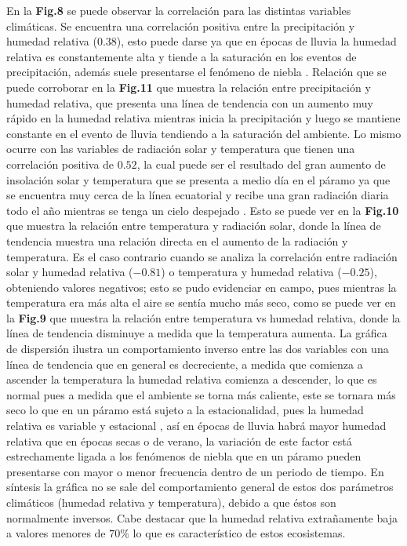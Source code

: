 \documentclass[conference,final,]{IEEEtran}
\begin{document}
En la \textbf{Fig.8} se puede observar la correlación para las distintas
variables climáticas. Se encuentra una correlación positiva entre la
precipitación y humedad relativa (\(0.38\)), esto puede darse ya que en
épocas de lluvia la humedad relativa es constantemente alta y tiende a
la saturación en los eventos de precipitación, además suele presentarse
el fenómeno de niebla \cite{morales2019atlas}. Relación que se puede
corroborar en la \textbf{Fig.11} que muestra la relación entre
precipitación y humedad relativa, que presenta una línea de tendencia
con un aumento muy rápido en la humedad relativa mientras inicia la
precipitación y luego se mantiene constante en el evento de lluvia
tendiendo a la saturación del ambiente. Lo mismo ocurre con las
variables de radiación solar y temperatura que tienen una correlación
positiva de \(0.52\), la cual puede ser el resultado del gran aumento de
insolación solar y temperatura que se presenta a medio día en el páramo
ya que se encuentra muy cerca de la línea ecuatorial y recibe una gran
radiación diaria todo el año mientras se tenga un cielo despejado
\cite{buytaert2006hidrologia}. Esto se puede ver en la \textbf{Fig.10}
que muestra la relación entre temperatura y radiación solar, donde la
línea de tendencia muestra una relación directa en el aumento de la
radiación y temperatura. Es el caso contrario cuando se analiza la
correlación entre radiación solar y humedad relativa (\(-0.81\)) o
temperatura y humedad relativa (\(-0.25\)), obteniendo valores
negativos; esto se pudo evidenciar en campo, pues mientras la
temperatura era más alta el aire se sentía mucho más seco, como se puede
ver en la \textbf{Fig.9} que muestra la relación entre temperatura vs
humedad relativa, donde la línea de tendencia disminuye a medida que la
temperatura aumenta. La gráfica de dispersión ilustra un comportamiento
inverso entre las dos variables con una línea de tendencia que en
general es decreciente, a medida que comienza a ascender la temperatura
la humedad relativa comienza a descender, lo que es normal pues a medida
que el ambiente se torna más caliente, este se tornara más seco lo que
en un páramo está sujeto a la estacionalidad, pues la humedad relativa
es variable y estacional \cite{hofstede2017p}, así en épocas de lluvia
habrá mayor humedad relativa que en épocas secas o de verano, la
variación de este factor está estrechamente ligada a los fenómenos de
niebla que en un páramo pueden presentarse con mayor o menor frecuencia
dentro de un periodo de tiempo. En síntesis la gráfica no se sale del
comportamiento general de estos dos parámetros climáticos (humedad
relativa y temperatura), debido a que éstos son normalmente inversos.
Cabe destacar que la humedad relativa extrañamente baja a valores
menores de \(70 \%\) lo que es característico de estos ecosistemas.
\cite{hofstede2017p}
\end{document}
